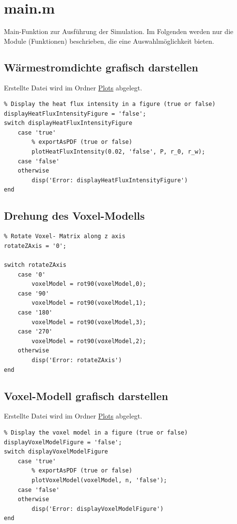 \documentclass{scrartcl}
\begin{document}
\section{main.m}\label{sec:main}

Main-Funktion zur Ausführung der Simulation. Im Folgenden werden nur die Module (Funktionen) beschrieben, die eine Auswahlmöglichkeit bieten.

\subsection{Wärmestromdichte grafisch darstellen}

Erstellte Datei wird im Ordner {\hyperref[sec:plots]{Plots}} abgelegt.

\begin{lstlisting}
% Display the heat flux intensity in a figure (true or false)
displayHeatFluxIntensityFigure = 'false';
switch displayHeatFluxIntensityFigure
    case 'true'
        % exportAsPDF (true or false)
        plotHeatFluxIntensity(0.02, 'false', P, r_0, r_w);
    case 'false'
    otherwise
        disp('Error: displayHeatFluxIntensityFigure')
end
\end{lstlisting}

\subsection{Drehung des Voxel-Modells}

\begin{lstlisting}
% Rotate Voxel- Matrix along z axis
rotateZAxis = '0';

switch rotateZAxis
    case '0'
        voxelModel = rot90(voxelModel,0);
    case '90'
        voxelModel = rot90(voxelModel,1);
    case '180'
        voxelModel = rot90(voxelModel,3);
    case '270'
        voxelModel = rot90(voxelModel,2);
    otherwise 
        disp('Error: rotateZAxis')
end
\end{lstlisting}

\subsection{Voxel-Modell grafisch darstellen}

Erstellte Datei wird im Ordner {\hyperref[sec:plots]{Plots}} abgelegt.

\begin{lstlisting}
% Display the voxel model in a figure (true or false)
displayVoxelModelFigure = 'false';
switch displayVoxelModelFigure
    case 'true'
        % exportAsPDF (true or false)
        plotVoxelModel(voxelModel, n, 'false');
    case 'false'
    otherwise
        disp('Error: displayVoxelModelFigure')
end
\end{lstlisting}
\end{document}
